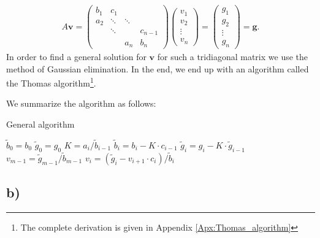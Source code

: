 \documentclass[english,notitlepage,nofootinbib]{revtex4-1}  %
\renewcommand{\vec}{\mathbf}
\begin{document}
\begin{align*}
    A\mathbf{v} = 
    \begin{pmatrix}
        b_1 & c_1 & & \\
        a_2 & \ddots & \ddots & \\ 
         & \ddots & & c_{n-1} \\
          & & a_n & b_n
    \end{pmatrix}
    \begin{pmatrix}
        v_1 \\
        v_2 \\
        \vdots \\ 
        v_{n}
    \end{pmatrix} = 
    \begin{pmatrix}
        g_1 \\
        g_2 \\ 
        \vdots \\
        g_{n}
    \end{pmatrix}
    = \mathbf{g}.
\end{align*}
In order to find a  general solution for $\vec{v}$ for such a tridiagonal matrix we use the method of Gaussian elimination. In the end, we end up with an algorithm called the Thomas algorithm\footnote{The complete derivation is given in Appendix \ref{Apx:Thomas_algorithm}}.


We summarize the algorithm as follows:

\begin{algorithm}[H]
    \caption{General algorithm}\label{algo:p6_general_algorithm}
    \begin{algorithmic}
        \State $\tilde{b}_0 = b_0$ 
        \State $\tilde{g}_0 = g_0$
         
        \State $K = a_i / \tilde{b}_{i-1}$
        \State $\tilde{b}_i=b_i - K \cdot  c_{i-1}$
        \State $\tilde{g}_i=g_i - K \cdot \tilde{g}_{i-1}$
        \EndFor \\
        \State $v_{m-1} = \tilde{g}_{m-1} / \tilde{b}_{m-1}$ 
         
        \State $v_i = (\tilde{g}_i - v_{i+1} \cdot  c_i) / \tilde{b}_i$ 
        \EndFor
    \end{algorithmic}
\end{algorithm}


\subsection*{b)}
\end{document}
